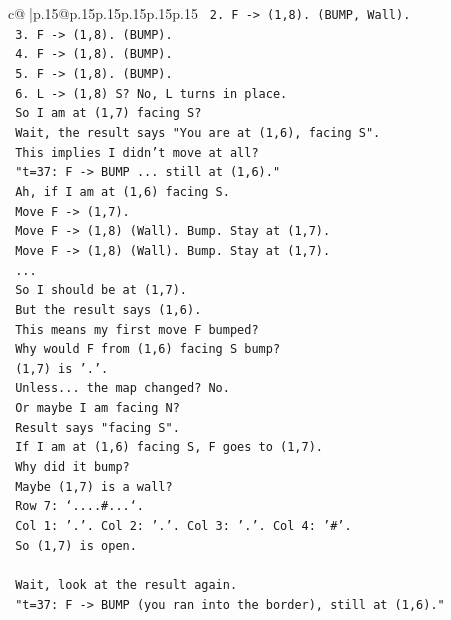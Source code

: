 \documentclass{article}
\begin{document}
{\begin{supertabular}{c@{$\;$}|p{.15\linewidth}@{}p{.15\linewidth}p{.15\linewidth}p{.15\linewidth}p{.15\linewidth}p{.15\linewidth}}
{{{\texttt{      2. F {-}> (1,8). (BUMP, Wall).} \\
\texttt{      3. F {-}> (1,8). (BUMP).} \\
\texttt{      4. F {-}> (1,8). (BUMP).} \\
\texttt{      5. F {-}> (1,8). (BUMP).} \\
\texttt{      6. L {-}> (1,8) S? No, L turns in place.} \\
\texttt{      So I am at (1,7) facing S?} \\
\texttt{      Wait, the result says "You are at (1,6), facing S".} \\
\texttt{      This implies I didn't move at all?} \\
\texttt{      "t=37: F {-}> BUMP ... still at (1,6)."} \\
\texttt{      Ah, if I am at (1,6) facing S.} \\
\texttt{      Move F {-}> (1,7).} \\
\texttt{      Move F {-}> (1,8) (Wall). Bump. Stay at (1,7).} \\
\texttt{      Move F {-}> (1,8) (Wall). Bump. Stay at (1,7).} \\
\texttt{      ...} \\
\texttt{      So I should be at (1,7).} \\
\texttt{      But the result says (1,6).} \\
\texttt{      This means my first move F bumped?} \\
\texttt{      Why would F from (1,6) facing S bump?} \\
\texttt{      (1,7) is '.'.} \\
\texttt{      Unless... the map changed? No.} \\
\texttt{      Or maybe I am facing N?} \\
\texttt{      Result says "facing S".} \\
\texttt{      If I am at (1,6) facing S, F goes to (1,7).} \\
\texttt{      Why did it bump?} \\
\texttt{      Maybe (1,7) is a wall?} \\
\texttt{      Row 7: `....\#...`.} \\
\texttt{      Col 1: '.'. Col 2: '.'. Col 3: '.'. Col 4: '\#'.} \\
\texttt{      So (1,7) is open.} \\
\\ 
\texttt{      Wait, look at the result again.} \\
\texttt{      "t=37: F {-}> BUMP (you ran into the border), still at (1,6)."} \\
}}}
\end{supertabular}}
\end{document}
